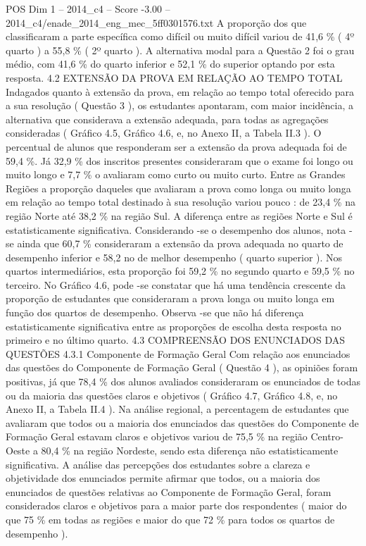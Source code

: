 \begin{textsample}{POS Dim 1 – 2014\_c4 – Score -3.00 – 2014\_c4/enade\_2014\_eng\_mec\_5ff0301576.txt}
A proporção dos que classificaram a parte específica como difícil ou muito difícil variou de 41,6 \% ( 4º quarto ) a 55,8 \% ( 2º quarto ).
A alternativa modal para a Questão 2 foi o grau médio, com 41,6 \% do quarto inferior e 52,1 \% do superior optando por esta resposta. 4.2 EXTENSÃO DA PROVA EM RELAÇÃO AO TEMPO TOTAL Indagados quanto à extensão da prova, em relação ao tempo total oferecido para a sua resolução ( Questão 3 ), os estudantes apontaram, com maior incidência, a alternativa que considerava a extensão adequada, para todas as agregações consideradas ( Gráfico 4.5, Gráfico 4.6, e, no Anexo II, a Tabela II.3 ).
O percentual de alunos que responderam ser a extensão da prova adequada foi de 59,4 \%.
Já 32,9 \% dos inscritos presentes consideraram que o exame foi longo ou muito longo e 7,7 \% o avaliaram como curto ou muito curto.
Entre as Grandes Regiões a proporção daqueles que avaliaram a prova como longa ou muito longa em relação ao tempo total destinado à sua resolução variou pouco : de 23,4 \% na região Norte até 38,2 \% na região Sul.
A diferença entre as regiões Norte e Sul é estatisticamente significativa.
Considerando -se o desempenho dos alunos, nota -se ainda que 60,7 \% consideraram a extensão da prova adequada no quarto de desempenho inferior e 58,2 no de melhor desempenho ( quarto superior ).
Nos quartos intermediários, esta proporção foi 59,2 \% no segundo quarto e 59,5 \% no terceiro.
No Gráfico 4.6, pode -se constatar que há uma tendência crescente da proporção de estudantes que consideraram a prova longa ou muito longa em função dos quartos de desempenho.
Observa -se que não há diferença estatisticamente significativa entre as proporções de escolha desta resposta no primeiro e no último quarto. 4.3 COMPREENSÃO DOS ENUNCIADOS DAS QUESTÕES 4.3.1 Componente de Formação Geral Com relação aos enunciados das questões do Componente de Formação Geral ( Questão 4 ), as opiniões foram positivas, já que 78,4 \% dos alunos avaliados consideraram os enunciados de todas ou da maioria das questões claros e objetivos ( Gráfico 4.7, Gráfico 4.8, e, no Anexo II, a Tabela II.4 ).
Na análise regional, a percentagem de estudantes que avaliaram que todos ou a maioria dos enunciados das questões do Componente de Formação Geral estavam claros e objetivos variou de 75,5 \% na região Centro-Oeste a 80,4 \% na região Nordeste, sendo esta diferença não estatisticamente significativa.
A análise das percepções dos estudantes sobre a clareza e objetividade dos enunciados permite afirmar que todos, ou a maioria dos enunciados de questões relativas ao Componente de Formação Geral, foram considerados claros e objetivos para a maior parte dos respondentes ( maior do que 75 \% em todas as regiões e maior do que 72 \% para todos os quartos de desempenho ).

\end{textsample}
